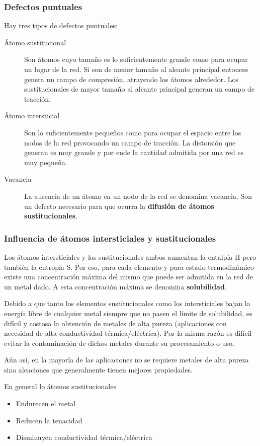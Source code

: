 \subsubsection{Defectos puntuales}
Hay tres tipos de defectos puntuales:

\begin{description}
    \item[Átomo sustitucional] Son átomos cuyo tamaño es lo suficientemente grande como para ocupar un lugar de la red. Si son de menor tamaño al aleante principal entonces genera un campo de compresión, atrayendo los átomos alrededor. Los sustitucionales de mayor tamaño al aleante principal generan un campo de tracción.
    \item[Átomo intersticial] Son lo suficientemente pequeños como para ocupar el espacio entre los nodos de la red provocando un campo de tracción. La distorsión que generan es muy grande y por ende la cantidad admitida por una red es muy pequeña. 
    \item[Vacancia] La ausencia de un átomo en un nodo de la red se denomina vacancia. Son un defecto necesario para que ocurra la \textbf{difusión de átomos sustitucionales}.
\end{description}

\subsubsection{Influencia de átomos intersticiales y sustitucionales}
Los átomos intersticiales y los sustitucionales ambos aumentan la entalpía H pero también la entropía S. Por eso, para cada elemento y para estado termodinámico existe una concentración máxima del mismo que puede ser admitida en la red de un metal dado. A esta concentración máxima se denomina \textbf{solubilidad}.


Debido a que tanto los elementos sustitucionales como los intersticiales bajan la energía libre de cualquier metal siempre que no pasen el límite de solubilidad, es difícil y costosa la obtención de metales de alta pureza (aplicaciones con necesidad de alta conductividad térmica/eléctrica). Por la misma razón es difícil evitar la contaminación de dichos metales durante su procesamiento o uso.

Aún así, en la mayoría de las aplicaciones no se requiere metales de alta pureza sino aleaciones que generalmente tienen mejores propiedades. 

En general lo átomos sustitucionales 
\begin{itemize}
    \item Endurecen el metal
    \item Reducen la tenacidad
    \item Disminuyen conductividad térmica/eléctrica
\end{itemize}


